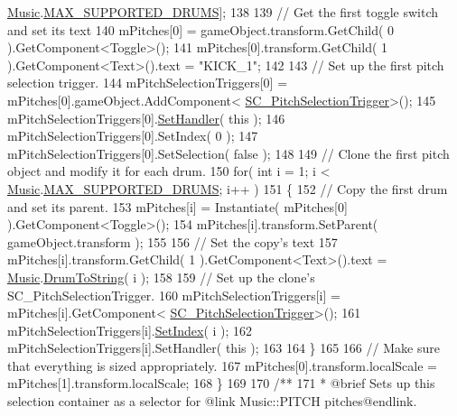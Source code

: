 \begin{DoxyCodeInclude}
      \hyperlink{class_music}{Music}.\hyperlink{group___music_constants_gabce1a1ac5b9b6355af6bd7fb3868467a}{MAX\_SUPPORTED\_DRUMS}];
138 
139         \textcolor{comment}{// Get the first toggle switch and set its text}
140         mPitches[0] = gameObject.transform.GetChild( 0 ).GetComponent<Toggle>();
141         mPitches[0].transform.GetChild( 1 ).GetComponent<Text>().text = \textcolor{stringliteral}{"KICK\_1"};
142 
143         \textcolor{comment}{// Set up the first pitch selection trigger.}
144         mPitchSelectionTriggers[0] = mPitches[0].gameObject.AddComponent<
      \hyperlink{class_s_c___pitch_selection_trigger}{SC\_PitchSelectionTrigger}>();
145         mPitchSelectionTriggers[0].\hyperlink{group___s_c___p_s_t_pub_func_ga0b334518dbdac5874adf9436cd2c7fed}{SetHandler}( \textcolor{keyword}{this} );
146         mPitchSelectionTriggers[0].SetIndex( 0 );
147         mPitchSelectionTriggers[0].SetSelection( \textcolor{keyword}{false} );
148 
149         \textcolor{comment}{// Clone the first pitch object and modify it for each drum.}
150         \textcolor{keywordflow}{for}( \textcolor{keywordtype}{int} i = 1; i < \hyperlink{class_music}{Music}.\hyperlink{group___music_constants_gabce1a1ac5b9b6355af6bd7fb3868467a}{MAX\_SUPPORTED\_DRUMS}; i++ )
151         \{
152             \textcolor{comment}{// Copy the first drum and set its parent.}
153             mPitches[i] = Instantiate( mPitches[0] ).GetComponent<Toggle>();
154             mPitches[i].transform.SetParent( gameObject.transform );
155 
156             \textcolor{comment}{// Set the copy's text}
157             mPitches[i].transform.GetChild( 1 ).GetComponent<Text>().text = 
      \hyperlink{class_music}{Music}.\hyperlink{group___music_stat_func_gaf5f64ebe9a7e036e07f283e41f26d22b}{DrumToString}( i );
158 
159             \textcolor{comment}{// Set up the clone's SC\_PitchSelectionTrigger.}
160             mPitchSelectionTriggers[i] = mPitches[i].GetComponent<
      \hyperlink{class_s_c___pitch_selection_trigger}{SC\_PitchSelectionTrigger}>();
161             mPitchSelectionTriggers[i].\hyperlink{group___s_c___p_s_t_pub_func_ga0b4edbf9719a384aa5cf8d29d1065696}{SetIndex}( i );
162             mPitchSelectionTriggers[i].SetHandler( \textcolor{keyword}{this} );
163 
164         \}
165 
166         \textcolor{comment}{// Make sure that everything is sized appropriately.}
167         mPitches[0].transform.localScale = mPitches[1].transform.localScale;
168     \}
169 \textcolor{comment}{}
170 \textcolor{comment}{    /**}
171 \textcolor{comment}{     * @brief Sets up this selection container as a selector for @link Music::PITCH pitches@endlink.}

\end{DoxyCodeInclude}
